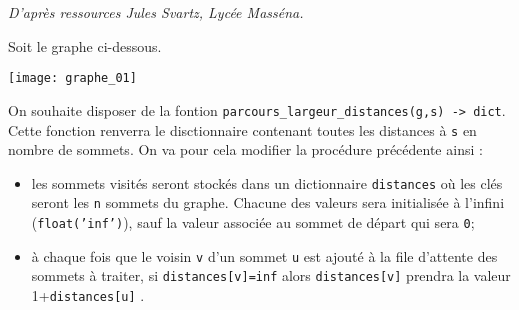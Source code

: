 \begin{flushright}
\textit{D'après ressources Jules Svartz, Lycée Masséna.}
\end{flushright}

Soit le graphe ci-dessous. 

\begin{center}
\texttt{[image: graphe\_01]}
\end{center}



%

On souhaite disposer de la fontion  \texttt{parcours\_largeur\_distances(g,s) -> dict}. Cette fonction renverra le disctionnaire contenant toutes les distances à \texttt{s} en nombre de sommets. On va pour cela modifier la procédure précédente ainsi :
\begin{itemize}
\item  les sommets visités seront stockés dans un dictionnaire \texttt{distances} où les clés seront les \texttt{n} sommets du graphe. Chacune des valeurs sera initialisée à l'infini (\texttt{float('inf')}), sauf la valeur associée au sommet de départ qui sera \texttt{0};
\item à chaque fois que le voisin \texttt{v} d'un sommet \texttt{u} est ajouté à la file d'attente des sommets à traiter, 
si \texttt{distances[v]=inf} alors \texttt{distances[v]} prendra la valeur 1+\texttt{distances[u]} .
\end{itemize}

